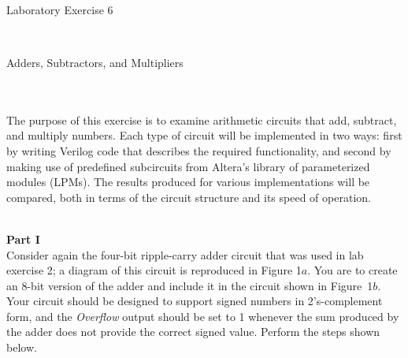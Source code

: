\documentclass[psfig,10pt,fullpage]{article}
\begin{document}
~\\
~\\
~\\
\centerline{\huge Laboratory Exercise 6}
~\\
\centerline{\large Adders, Subtractors, and Multipliers}
~\\
~\\

The purpose of this exercise is to examine arithmetic circuits that add, subtract,
and multiply numbers. Each type of circuit will be implemented in two ways: first by writing
Verilog code that describes the required functionality, and second by making use
of predefined subcircuits from Altera's library of parameterized modules (LPMs). The
results produced for various implementations will be compared, both in terms of the circuit
structure and its speed of operation.

~\\
\noindent
{\bf Part I}
~\\

\noindent
Consider again the four-bit ripple-carry adder circuit that was used in lab exercise 2;
a diagram of this circuit is reproduced in Figure 1$a$. You are to create an 8-bit 
version of the adder and include it in the circuit shown in Figure~1$b$. Your circuit
should be designed to support signed numbers in 2's-complement form, and 
the {\it Overflow} output should be set to 1 whenever the sum
produced by the adder does not provide the correct signed value. Perform the 
steps shown below.
\end{document}
